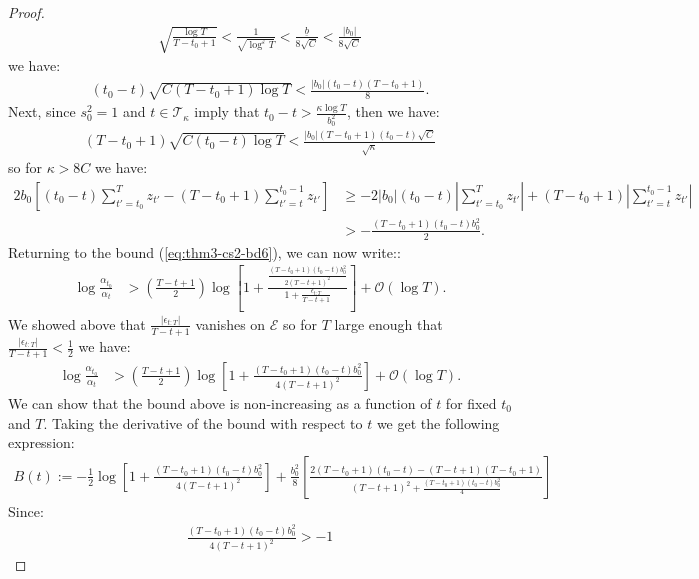 \begin{proof}
\begin{align*}
    \sqrt{\frac{\log T}{T-t_0+1}} < \frac{1}{\sqrt{\log^{\varepsilon} T}} < \frac{\underline{b}}{8\sqrt{C}} < \frac{|b_0|}{8 \sqrt{C}}
\end{align*}
we have:
\begin{align*}
    (t_0-t)\sqrt{C(T-t_0+1)\log T} < \frac{|b_0|(t_0 - t)(T-t_0+1)}{8}.
\end{align*}
Next, since $s_0^2 = 1$ and $t \in \mathcal{T}_\kappa$ imply that $t_0 - t > \frac{\kappa\log T}{b_0^2}$, then we have:
\begin{align*}
    (T-t_0+1)\sqrt{C(t_0-t)\log T} < \frac{|b_0|(T-t_0+1)(t_0 -t)\sqrt{C}}{\sqrt{\kappa}}
\end{align*}
so for $\kappa > 8C$ we have: 
\begin{align*}
    2b_0\left[(t_0-t)\sum_{t'=t_0}^{T} z_{t'} - (T-t_0+1)\sum_{t'=t}^{t_0-1} z_{t'}\right] &\geq - 2|b_0|(t_0-t)\left|\sum_{t'=t_0}^{T} z_{t'}\right| + (T-t_0+1)\left|\sum_{t'=t}^{t_0-1} z_{t'}\right| \\
    &> - \frac{(T-t_0+1)(t_0-t)b_0^2}{2}.
\end{align*}
Returning to the bound (\ref{eq:thm3-cs2-bd6}), we can now write::
\begin{align*}
    \log \frac{\alpha_{t_0}}{\alpha_t} &> \left(\frac{T - t +1}{2}\right)\log\left[1 +\frac{\frac{(T-t_0+1)(t_0-t)b_0^2}{2(T-t+1)^2}}{1 + \frac{\epsilon_{t:T}}{T-t+1}} \right] + \mathcal{O}(\log T).
\end{align*}
We showed above that $\frac{|\epsilon_{t:T}|}{T-t+1}$ vanishes on $\mathcal{E}$ so for $T$ large enough that $\frac{|\epsilon_{t:T}|}{T-t+1} < \frac{1}{2}$ we have:
\begin{align}
    \log \frac{\alpha_{t_0}}{\alpha_t} &> \left(\frac{T - t +1}{2}\right)\log\left[1 +\frac{(T-t_0+1)(t_0-t)b_0^2}{4(T-t+1)^2} \right] + \mathcal{O}(\log T). \label{eq:thm3-cs2-bd7}
\end{align}
We can show that the bound above is non-increasing as a function of $t$ for fixed $t_0$ and $T$. Taking the derivative of the bound with respect to $t$ we get the following expression: 
\begin{align}
    B(t) := -\frac{1}{2}\log\left[1 +\frac{(T-t_0+1)(t_0-t)b_0^2}{4(T-t+1)^2} \right] + \frac{b_0^2}{8}\left[\frac{2(T-t_0+1)(t_0-t)-(T-t+1)(T-t_0+1)}{(T-t+1)^2 +\frac{(T-t_0+1)(t_0-t)b_0^2}{4}}\right] \label{eq:thm3-cs2-derivative2}
\end{align}
Since: 
\begin{align*}
    \frac{(T-t_0+1)(t_0-t)b_0^2}{4(T-t+1)^2} > -1
\end{align*}

\end{proof}
